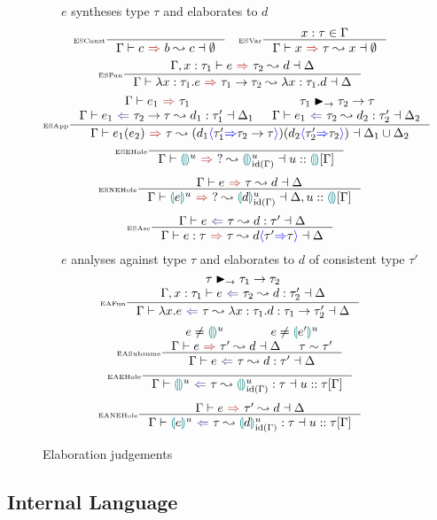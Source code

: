 \begin{figure}[H]
\ \ \ $e$ syntheses type $\tau$ and elaborates to $d$
\[\inference[\tiny ESConst]{}{\elaborationSynthesis{c}{b}{c}{\emptyset}} \quad 
\inference[\tiny ESVar]{x : \tau \in \Gamma}{\elaborationSynthesis{x}{\tau}{x}{\emptyset}}\]
\[\inference[\tiny ESFun]{\elaborationSynthesis[\Gamma,x:\tau_1]{e}{\tau_2}{d}{\Delta}}{\elaborationSynthesis{\lambda x:\tau_1.e}{\tau_1 \to \tau_2}{\lambda x:\tau_1. d}{\Delta}}\]
\[\inference[\tiny ESApp]{\synthesis{e_1}{\tau_1} & \tau_1 \funmatch \tau_2 \to \tau \\ \elaborationAnalysis{e_1}{\tau_2 \to \tau}{d_1}{\tau_1'}{\Delta_1} & \elaborationAnalysis{e_1}{\tau_2}{d_2}{\tau_2'}{\Delta_2}}{\elaborationSynthesis{e_1(e_2)}{\tau}{(d_1\scast{\tau_1'}{\tau_2 \to \tau})(d_2\scast{\tau_2'}{\tau_2})}{\Delta_1 \cup \Delta_2}}\]
\[\inference[\tiny ESEHole]{}{\elaborationSynthesis{\hole^u}{?}{\hole^u_{\mathrm{id}(\Gamma)}}{u :: \hole[] [\Gamma]}}\]
\[\inference[\tiny ESNEHole]{\elaborationSynthesis{e}{\tau}{d}{\Delta}}{\elaborationSynthesis{\hole[e]^u}{?}{\hole[d]^u_{\mathrm{id}(\Gamma)}}{\Delta, u :: \hole[] [\Gamma]}}\]
\[\inference[\tiny ESAsc]{\elaborationAnalysis{e}{\tau}{d}{\tau'}{\Delta}}{\elaborationSynthesis{e:\tau}{\tau}{d\scast{\tau'}{\tau}}{\Delta}}\]
\ \ \ $e$ analyses against type $\tau$ and elaborates to $d$ of consistent type $\tau'$
\[\inference[\tiny EAFun]{\tau \funmatch \tau_1 \to \tau_2 \\ \elaborationAnalysis[\Gamma,x:\tau_1]{e}{\tau_2}{d}{\tau_2'}{\Delta}}{\elaborationAnalysis{\lambda x. e}{\tau}{\lambda x:\tau_1. d}{\tau_1 \to \tau_2'}{\Delta}}\]
\[\inference[\tiny EASubsume]{e \neq \hole^u & e \neq \hole[e']^u \\ \elaborationSynthesis{e}{\tau'}{d}{\Delta} & \tau \sim \tau'}{\elaborationAnalysis{e}{\tau}{d}{\tau'}{\Delta}}\]
\[\inference[\tiny EAEHole]{}{\elaborationAnalysis{\hole^u}{\tau}{\hole^u_{\mathrm{id}(\Gamma)}}{\tau}{u::\tau[\Gamma]}}\]
\[\inference[\tiny EANEHole]{\elaborationSynthesis{e}{\tau'}{d}{\Delta}}{\elaborationAnalysis{\hole[e]^u}{\tau}{\hole[d]^u_{\mathrm{id}(\Gamma)}}{\tau}{u::\tau[\Gamma]}}\]

\caption{Elaboration judgements} 
\label{fig:elaboration}
\end{figure}

\subsection{Internal Language}


